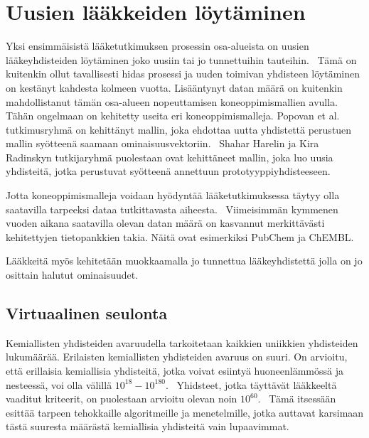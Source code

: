 \documentclass[finnish,twoside,censored,subject,sw-line]{HYthesisML}
\begin{document}
\chapter{Uusien lääkkeiden löytäminen}


Yksi ensimmäisistä lääketutkimuksen prosessin osa-alueista on uusien lääkeyhdisteiden löytäminen joko uusiin tai jo tunnettuihin tauteihin.~\cite{EkinsSean2019Emlf}
Tämä on kuitenkin ollut tavallisesti hidas prosessi ja uuden toimivan yhdisteen löytäminen on kestänyt kahdesta kolmeen vuotta.
Lisääntynyt datan määrä on kuitenkin mahdollistanut tämän osa-alueen nopeuttamisen koneoppimismallien avulla.
Tähän ongelmaan on kehitetty useita eri koneoppimismalleja.
Popovan et al. tutkimusryhmä on kehittänyt mallin, joka ehdottaa uutta yhdistettä perustuen mallin syötteenä saamaan ominaisuusvektoriin.~\cite{PopovaMariya2018Drlf}
Shahar Harelin ja Kira Radinskyn tutkijaryhmä puolestaan ovat kehittäneet mallin, joka luo uusia yhdisteitä, jotka perustuvat syötteenä annettuun prototyyppiyhdisteeseen.~\cite{ShaharHarelAndKiraRadinsky}

Jotta koneoppimismalleja voidaan hyödyntää lääketutkimuksessa täytyy olla saatavilla tarpeeksi dataa tutkittavasta aiheesta.~\cite{EkinsSean2019Emlf}
Viimeisimmän kymmenen vuoden aikana saatavilla olevan datan määrä on kasvannut merkittävästi kehitettyjen tietopankkien takia.
Näitä ovat esimerkiksi PubChem ja ChEMBL.

Lääkkeitä myös kehitetään muokkaamalla jo tunnettua lääkeyhdistettä jolla on jo osittain halutut ominaisuudet.~\cite{ShaharHarelAndKiraRadinsky}


\section{Virtuaalinen seulonta}

Kemiallisten yhdisteiden avaruudella tarkoitetaan kaikkien uniikkien yhdisteiden lukumäärää.
Erilaisten kemiallisten yhdisteiden avaruus on suuri.
On arvioitu, että erillaisia kemiallisia yhdisteitä, jotka voivat esiintyä huoneenlämmössä ja nesteessä, voi olla välillä $10^{18} - 10^{180}$.~\cite{SotrifferChristoph2011VSPC}
Yhidsteet, jotka täyttävät lääkkeeltä vaaditut kriteerit, on puolestaan arvioitu olevan noin $10^{60}$.~\cite{SotrifferChristoph2011VSPC}
Tämä itsessään esittää tarpeen tehokkaille algoritmeille ja menetelmille, jotka auttavat karsimaan tästä suuresta määrästä kemiallisia yhdisteitä vain lupaavimmat.
\end{document}
